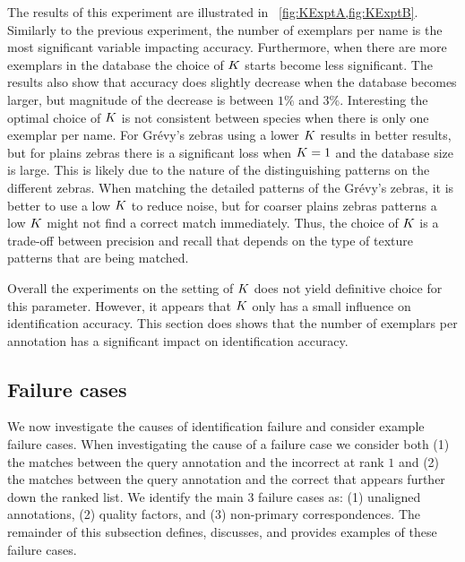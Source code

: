         The results of this experiment are illustrated in ~\cref{fig:KExptA,fig:KExptB}. Similarly to the previous
        experiment, the number of exemplars per name is the most significant variable impacting accuracy.
        Furthermore, when there are more exemplars in the database the choice of $K$ starts become less
        significant. The results also show that accuracy does slightly decrease when the database becomes larger,
        but magnitude of the decrease is between $1\percent$ and $3\percent$. Interesting the optimal choice of
        $K$ is not consistent between species when there is only one exemplar per name. For Grévy's zebras using a
        lower $K$ results in better results, but for plains zebras there is a significant loss when $K=1$ and the
        database size is large. This is likely due to the nature of the distinguishing patterns on the different
        zebras. When matching the detailed patterns of the Grévy's zebras, it is better to use a low $K$ to reduce
        noise, but for coarser plains zebras patterns a low $K$ might not find a correct match immediately. Thus,
        the choice of $K$ is a trade-off between precision and recall that depends on the type of texture patterns
        that are being matched.
        
        Overall the experiments on the setting of $K$ does not yield definitive choice for this parameter.
        However, it appears that $K$ only has a small influence on identification accuracy. This section does
        shows that the number of exemplars per annotation has a significant impact on identification accuracy.

        \KExptA{}
        \KExptB{}

    \FloatBarrier{}
    \subsection{Failure cases}\label{sub:exptfail}  
        
        We now investigate the causes of identification failure and consider example failure cases. When
        investigating the cause of a failure case we consider both (1) the matches between the query annotation and
        the incorrect \name{}  at rank $1$ and (2) the matches between the query annotation and the correct \name{}
        that appears further down the ranked list. We identify the main 3 failure cases as: (1) unaligned
        annotations, (2) quality factors, and (3) non-primary correspondences. The remainder of this subsection
        defines, discusses, and provides examples of these failure cases.

